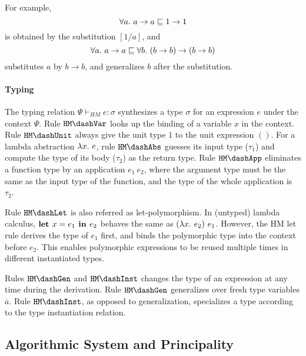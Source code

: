 For example, $$\all a \to a \sqsubseteq 1 \to 1$$
is obtained by the substitution $[1/a]$, and
$$\all a \to a \sqsubseteq \all[b] (b \to b) \to (b \to b)$$
substitutes $a$ by $b \to b$, and generalizes $b$ after the substitution.


\paragraph{Typing}
The typing relation $\Psi \vdash_{HM} e:\sigma$ synthesizes a type $\sigma$ for
an expression $e$ under the context $\Psi$.
Rule $\mathtt{HM \dash Var}$ looks up the binding of a variable $x$ in the context.
Rule $\mathtt{HM \dash Unit}$ always give the unit type $1$ to the unit expression $()$.
For a lambda abstraction $\lam e$, rule $\mathtt{HM \dash Abs}$ guesses its input type ($\tau_1$)
and compute the type of its body ($\tau_2$) as the return type.
Rule $\mathtt{HM \dash App}$ eliminates a function type by an application $e_1~e_2$,
where the argument type must be the same as the input type of the function,
and the type of the whole application is $\tau_2$.

Rule $\mathtt{HM \dash Let}$ is also referred as let-polymorphism.
In (untyped) lambda calculus, $\textbf{let } x={e_1} \textbf{ in } {e_2}$ behaves the same as $(\lam e_2)~e_1$.
However, the HM let rule derives the type of $e_1$ first,
and binds the polymorphic type into the context before $e_2$.
This enables polymorphic expressions to be reused multiple times in different instantiated types.

Rules $\mathtt{HM \dash Gen}$ and $\mathtt{HM \dash Inst}$ changes the type of an expression
at any time during the derivation.
Rule $\mathtt{HM \dash Gen}$ generalizes over fresh type variables $\overline{a}$.
Rule $\mathtt{HM \dash Inst}$, as opposed to generalization, specializes a type
according to the type instantiation relation.

\subsection{Algorithmic System and Principality}

